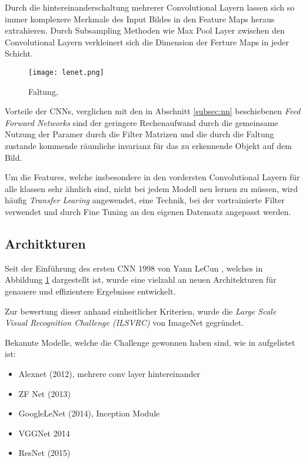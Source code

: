 Durch die hintereinanderschaltung mehrerer Convolutional Layern 
lassen sich so immer komplexere Merkmale des Input Bildes in den 
Feature Maps heraus extrahieren.
Durch Subsampling Methoden wie Max Pool Layer zwischen den Convolutional
Layern verkleinert sich die Dimension der Ferture Maps in jeder Schicht.


\begin{figure}[H]
    \centering
    \label{fig:lenet}
    \texttt{[image: lenet.png]}
    \caption{Faltung, \cite{lecunGradientBasedLearningApplied1998}}
\end{figure}


Vorteile der CNNs, verglichen mit den in Abschnitt \ref{subsec:nn} beschiebenen 
\textit{Feed Forward Networks} sind der geringere Rechenaufwand
durch die gemeinsame Nutzung der Paramer durch die Filter Matrizen und die durch die 
Faltung zustande kommende räumliche invarianz für das zu erkennende 
Objekt auf dem Bild.

Um die Features, welche insbesondere in den vordersten Convolutional 
Layern für alle klassen sehr ähnlich sind, nicht bei jedem Modell
neu lernen zu müssen, wird häufig \textit{Transfer Learing} angewendet, 
eine Technik, bei der vortrainierte Filter verwendet und durch Fine 
Tuning an den eigenen Datensatz angepasst werden.


\subsection{Architkturen}\label{subsubsec:architecture}

Seit der Einführung des ersten CNN 1998 von Yann LeCun
\cite{lecunGradientBasedLearningApplied1998}, welches in 
Abbildung \ref{fig:lenet} dargestellt ist, wurde eine 
vielzahl an neuen Architekturen für genauere und effizientere
Ergebnisse entwickelt.

Zur bewertung dieser anhand einheitlicher Kriterien,
wurde die \textit{Large Scale Visual Recognition Challenge (ILSVRC)}
\cite{ImageNetLargeScale} von ImageNet gegründet.

Bekannte Modelle, welche die Challenge gewonnen haben 
sind, wie in \cite{StanfordCS231nConvolutional} aufgelistet ist:


\begin{itemize}
    \item Alexnet (2012), mehrere conv layer hintereinander
    \item ZF Net (2013)
    \item GoogleLeNet (2014), Inception Module
    \item VGGNet 2014
    \item ResNet (2015)
\end{itemize}




